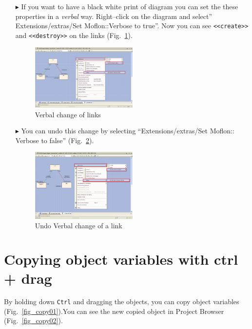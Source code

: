 \begin{enumerate}
\item[$\blacktriangleright$]If you want to have a black white print of diagram 
you can set the these properties in a \emph{verbal} way. Right–click on the
diagram and select'' Extensions/extras/Set Moflon::Verbose to
true''. Now you can see \texttt{<<create>>} and \texttt{<<destroy>>} on the
links (Fig.~\ref{fig_usingVerbose01}).

\begin{figure}[htbp]
\begin{center}
  \includegraphics[width=0.5\textwidth]{pics/tricks/usingVerbose/usingVerbose1}
  \caption{Verbal change of links}  
  \label{fig_usingVerbose01}
\end{center}
\end{figure}


\item[$\blacktriangleright$]You can undo this change by selecting
``Extensions/extras/Set Moflon:: Verbose to
false'' (Fig.~\ref{fig_usingVerbose02}).

 \begin{figure}[htbp]
\begin{center}
  \includegraphics[width=0.5\textwidth]{pics/tricks/usingVerbose/usingVerbose2}
  \caption{Undo Verbal change of a link}  
  \label{fig_usingVerbose02}
\end{center}
\end{figure}

\end{enumerate}


\section{Copying object variables with ctrl + drag}
By holding down \texttt{Ctrl} and dragging the objects, you can copy object
variables (Fig.~\ref{fig_copy01}).You can see the new copied object in Project
Browser (Fig.~\ref{fig_copy02}).

